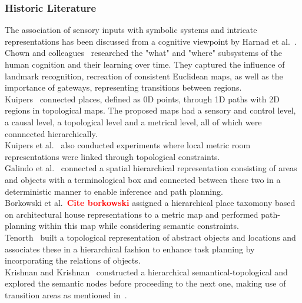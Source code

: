 \documentclass[twocolumn,letterpaper]{IEEEAerospaceCLS}  %
\newcommand\todo[1]{\textbf{\textcolor{red}{#1}}}
\begin{document}
\subsubsection{Historic Literature} \label{sssec:ResLitHist}
The association of sensory inputs with symbolic systems and intricate representations has been discussed from a cognitive viewpoint by Harnad et al.~\cite{harnad_symbol_1990}.\\
Chown and colleagues~\cite{chown_prototypes_1995} researched the "what" and "where" subsystems of the human cognition and their learning over time. They captured the influence of landmark recognition, recreation of consistent Euclidean maps, as well as the importance of gateways, representing transitions between regions.\\
Kuipers~\cite{kuipers_spatial_2000} connected places, defined as 0D points, through 1D paths with 2D regions in topological maps. The proposed maps had a sensory and control level, a causal level, a topological level and a metrical level, all of which were connnected hierarchically.\\ Kuipers et al.~\cite{kuipers_local_2004} also conducted experiments where local metric room representations were linked through topological constraints.\\
Galindo et al.~\cite{galindo_robot_2008} connected a spatial hierarchical representation consisting of areas and objects with a terminological box and connected between these two in a deterministic manner to enable inference and path planning.\\
Borkowski et al.~\todo{Cite borkowski} assigned a hierarchical place taxomony based on architectural house representations to a metric map and performed path-planning within this map while considering semantic constraints.\\
Tenorth~\cite{tenorth_knowrob-map_2010} built a topological representation of abstract objects and locations and associates these in a hierarchical fashion to enhance task planning by incorporating the relations of objects.\\
Krishnan and Krishnan~\cite{krishnan_visual_2010} constructed a hierarchical semantical-topological and explored the semantic nodes before proceeding to the next one, making use of transition areas as mentioned in~\cite{chown_prototypes_1995}.
\end{document}
